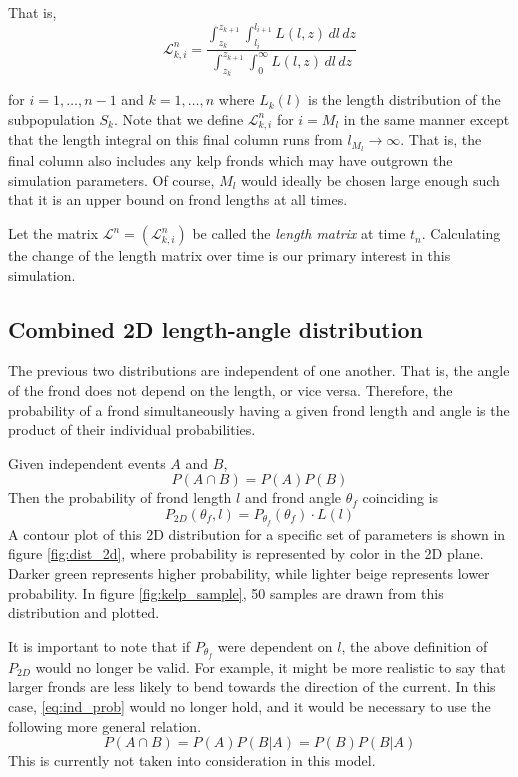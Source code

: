 \documentclass[10pt]{article}
\newcommand\LL{\mathcal{L}}
\begin{document}
\begin{multicols}{2}
That is,
\begin{equation}
	\LL_{k,i}^n = \frac{\displaystyle\int_{z_k}^{z_{k+1}}\int_{l_i}^{l_{i+1}}L(l,z)\,dl\,dz}
	{\displaystyle\int_{z_k}^{z_{k+1}}\int_0^\infty L(l,z)\,dl\,dz}
	\label{eqn:lmatrix}
\end{equation}

for $i=1,\ldots,n-1$ and $k=1,\ldots,n$ where $L_k(l)$ is the length distribution of the subpopulation $S_k$.
Note that we define $\LL_{k,i}^n$ for $i=M_l$ in the same manner except that the length integral on this final column runs from $l_{M_l} \to \infty$. That is, the final column also includes any kelp fronds which may have outgrown the simulation parameters.
Of course, $M_l$ would ideally be chosen large enough such that it is an upper bound on frond lengths at all times.

Let the matrix $\LL^n = \left(\LL_{k,i}^n\right)$ be called the \textit{length matrix} at time $t_n$.
Calculating the change of the length matrix over time is our primary interest in this simulation.


\subsection{Combined 2D length-angle distribution}
\label{sec:2d_dist}
The previous two distributions are independent of one another. That is, the angle of the frond does not depend on the length, or vice versa.
Therefore, the probability of a frond simultaneously having a given frond length and angle is the product of their individual probabilities.

Given independent events $A$ and $B$,
\begin{equation}
	\label{eq:ind_prob}
	P(A \cap B) = P(A)P(B)
\end{equation}
Then the probability of frond length $l$ and frond angle $\theta_f$ coinciding is 
\begin{equation}
	P_{2D}(\theta_f,l) = P_{\theta_f}(\theta_f) \cdot L(l)
\end{equation}
A contour plot of this 2D distribution for a specific set of parameters is shown in figure \ref{fig:dist_2d}, where probability is represented by color in the 2D plane.
Darker green represents higher probability, while lighter beige represents lower probability.
In figure \ref{fig:kelp_sample}, 50 samples are drawn from this distribution and plotted.

It is important to note that if $P_{\theta_f}$ were dependent on $l$, the above definition of $P_{2D}$ would no longer be valid.
For example, it might be more realistic to say that larger fronds are less likely to bend towards the direction of the current.
In this case, \eqref{eq:ind_prob} would no longer hold, and it would be necessary to use the following more general relation.
\begin{equation}
	P(A \cap B) = P(A)P(B|A) = P(B)P(B|A)
\end{equation}
This is currently not taken into consideration in this model.


\end{multicols}
\end{document}
